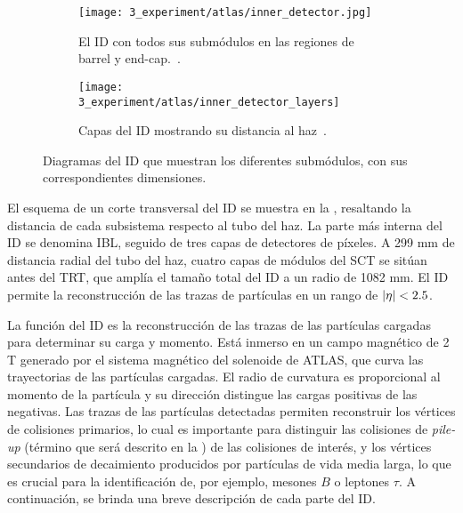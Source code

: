 \begin{figure}[ht!]
    \centering
    \begin{subfigure}[t]{0.49\linewidth}
        \centering
        \texttt{[image: 3\_experiment/atlas/inner\_detector.jpg]}
        \caption{El \ac{ID} con todos sus submódulos en las regiones de barrel y end-cap.~\cite{ATLAS-InnerDetector}.}
        \label{fig:atlas:atlas:atlas_inner_detector:general}
    \end{subfigure}
    \hfill
    \begin{subfigure}[t]{0.49\linewidth}
        \centering
        \texttt{[image: 3\_experiment/atlas/inner\_detector\_layers]}
        \caption{Capas del \ac{ID} mostrando su distancia al haz~\cite{ATLAS-InnerDetector}.}
        \label{fig:atlas:atlas:atlas_inner_detector:layer_radius}
    \end{subfigure}
    \caption{Diagramas del \ac{ID} que muestran los diferentes submódulos, con sus correspondientes dimensiones.}
    \label{fig:atlas:atlas:atlas_inner_detector}
\end{figure}

El esquema de un corte transversal del \acf{ID} \cite{ATLAS-ID-TDR} se muestra en la \Fig{\ref{fig:atlas:atlas:atlas_inner_detector}}, resaltando la distancia de cada subsistema respecto al tubo del haz. La parte más interna del \ac{ID} se denomina \ac{IBL}, seguido de tres capas de detectores de píxeles. A 299 mm de distancia radial del tubo del haz, cuatro capas de módulos del \ac{SCT} se sitúan antes del \ac{TRT}, que amplía el tamaño total del \ac{ID} a un radio de 1082 mm. El \ac{ID} permite la reconstrucción de las trazas de partículas en un rango de $|\eta| < 2.5$.


La función del \ac{ID} es la reconstrucción de las trazas de las partículas cargadas para determinar su carga y momento. Está inmerso en un campo magnético de 2 T generado por el sistema magnético del solenoide de \ac{ATLAS}, que curva las trayectorias de las partículas cargadas. El radio de curvatura es proporcional al momento de la partícula y su dirección distingue las cargas positivas de las negativas. Las trazas de las partículas detectadas permiten reconstruir los vértices de colisiones primarios, lo cual es importante para distinguir las colisiones de \textit{pile-up} (término que será descrito en la \Sect{\ref{sec:atlas:runs}}) de las colisiones de interés, y los vértices secundarios de decaimiento producidos por partículas de vida media larga, lo que es crucial para la identificación de, por ejemplo, mesones \(B\) o leptones \(\tau\). A continuación, se brinda una breve descripción de cada parte del \ac{ID}.


